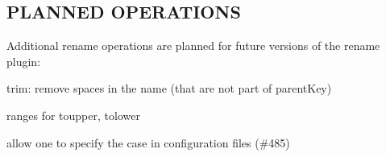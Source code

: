 \subsection*{P\+L\+A\+N\+N\+E\+D O\+P\+E\+R\+A\+T\+I\+O\+N\+S}

Additional rename operations are planned for future versions of the rename plugin\+:
\begin{DoxyItemize}
\item trim\+: remove spaces in the name (that are not part of parent\+Key)
\item ranges for toupper, tolower
\item allow one to specify the case in configuration files (\#485) 
\end{DoxyItemize}